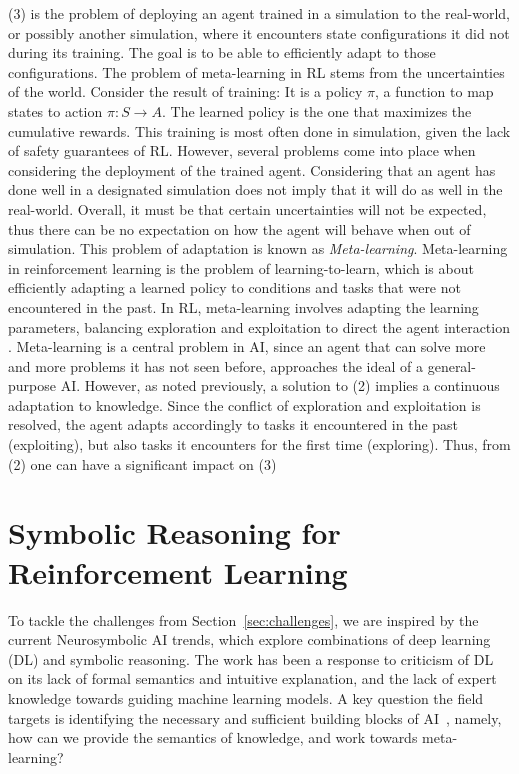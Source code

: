 \documentclass[a4paper,11pt]{article}
\theoremstyle{definition}
\begin{document}
(3) is the problem of deploying an agent trained in a simulation to
the real-world, or possibly another simulation, where it encounters
state configurations it did not during its training. The goal is to
be able to efficiently adapt to those configurations. The problem of meta-learning in RL stems from the uncertainties of the world. 
Consider the result of training: It is a policy $\pi$, a function to map states to action $\pi : S \rightarrow A$. The learned policy is the one that maximizes the cumulative rewards.
This training is most often done in simulation, given the lack of safety guarantees of RL. 
However, several problems come into place when considering the deployment of the trained agent. Considering that an agent has done well in 
a designated simulation does not imply that it will do as well in the real-world. Overall, it must be that certain uncertainties will not be expected, thus there can be no expectation on how the agent will behave 
when out of simulation. This problem of adaptation is known as \emph{Meta-learning}. Meta-learning in reinforcement learning is the problem of learning-to-learn, which is about efficiently
adapting a learned policy to conditions and tasks that were not encountered in the past. In RL, meta-learning
involves adapting the learning parameters, balancing exploration and exploitation to direct the
agent interaction \cite{gupta_meta-reinforcement_2018,schweighofer_meta-learning_2003}. Meta-learning is a central problem in AI, since an agent that can solve more
and more problems it has not seen before, approaches the ideal of a general-purpose AI. However, as noted previously, a solution to (2) implies 
a continuous adaptation to knowledge. Since the conflict of exploration and exploitation is resolved, the agent adapts accordingly to tasks it encountered in the past (exploiting), but also 
tasks it encounters for the first time (exploring). Thus, from (2) one can have a significant impact on (3)


\section{Symbolic Reasoning for Reinforcement Learning} 
\label{symrl}

To tackle the challenges from Section~\ref{sec:challenges}, we are
inspired by the current Neurosymbolic AI trends, which explore
combinations of deep learning (DL) and symbolic reasoning.
%
The work has been a response to criticism of DL on its lack of formal
semantics and intuitive explanation, and the lack of expert knowledge
towards guiding machine learning models.
%
A key question the field targets is identifying the necessary and
sufficient building blocks of AI~\cite{garcez2020neurosymbolic},
namely, how can we provide the semantics of knowledge, and work
towards meta-learning? 
\end{document}
